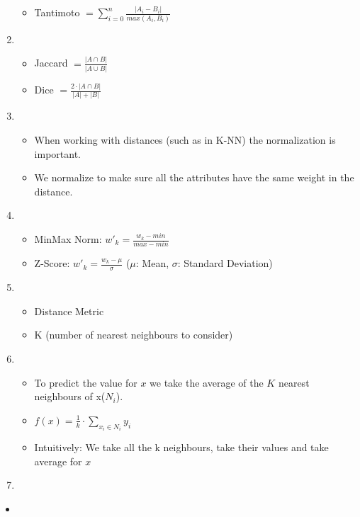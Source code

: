 \documentclass[11pt]{article}
\begin{document}
\begin{enumerate}
\begin{itemize}
                  \item Tantimoto $= \sum_{i=0}^{n} \frac{|A_i - B_i|}{max(A_i, B_i)}$
        \end{itemize}
        \item \begin{itemize}
                  \item Jaccard $= \frac{|A \cap B |}{|A \cup B|}$
                  \item Dice $= \frac{2 \cdot |A \cap B |}{|A| + |B|}$
        \end{itemize}
        \item \begin{itemize}
                  \item When working with distances (such as in K-NN) the normalization is important.
                  \item We normalize to make sure all the attributes have the same weight in the distance.
        \end{itemize}
        \item \begin{itemize}
                  \item MinMax Norm: $w'_k = \frac{w_k - min}{ max - min}$
                  \item Z-Score: $w'_k = \frac{w_k - \mu}{\sigma}$ ($\mu$: Mean, $\sigma$: Standard Deviation)
        \end{itemize}
        \item \begin{itemize}
                  \item Distance Metric
                  \item K (number of nearest neighbours to consider)
        \end{itemize}
        \item \begin{itemize}
                  \item To predict the value for $x$ we take the average of the $K$ nearest neighbours of x($N_i$).
                  \item $f(x) = \frac{1}{k} \cdot \sum_{x_i \in N_i}^{} y_i $
                  \item Intuitively: We take all the k neighbours, take their values and take average for $x$
        \end{itemize}
        \item

    \end{enumerate}
    \begin{itemize}
        \item
    \end{itemize}
\end{document}
